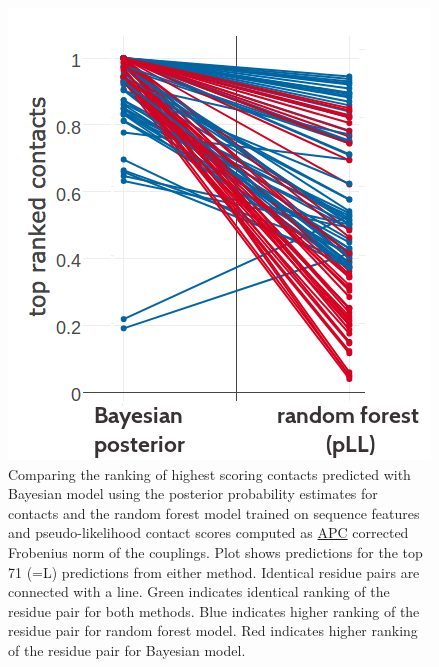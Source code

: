 \documentclass[11pt,a4paper,twoside]{book}
\theoremstyle{definition}
\theoremstyle{definition}
\theoremstyle{remark}
\begin{document}
\begin{figure}

{\centering \includegraphics[width=0.48\linewidth]{img/bayesian_model/contact_maps/1c75A00/comparative_value_top_ranked_contacts_for_1c75A00_method1_Bayesian_posterior_method2_Random_Forest_pLL_seqsep8} 

}

\caption{Comparing the ranking of highest
scoring contacts predicted with Bayesian model using the posterior
probability estimates for contacts and the random forest model trained
on sequence features and pseudo-likelihood contact scores computed as
\protect\hyperlink{abbrev}{APC} corrected Frobenius norm of the
couplings. Plot shows predictions for the top 71 (=L) predictions from
either method. Identical residue pairs are connected with a line. Green
indicates identical ranking of the residue pair for both methods. Blue
indicates higher ranking of the residue pair for random forest model.
Red indicates higher ranking of the residue pair for Bayesian model.}\label{fig:ranking-bayesian-1c75a00}
\end{figure}
\end{document}

